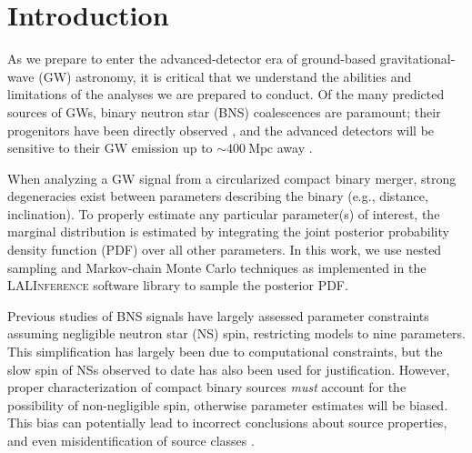 \section{Introduction}

As we prepare to enter the advanced-detector era of ground-based gravitational-wave (GW) astronomy, it is critical that we understand the abilities and limitations of the analyses we are prepared to conduct. Of the many predicted sources of GWs, binary neutron star (BNS) coalescences are paramount; their progenitors have been directly observed \cite{Lorimer_2008}, and the advanced detectors will be sensitive to their GW emission up to $\sim 400~\mathrm{Mpc}$ away \citep{2013arXiv1304.0670L}.

When analyzing a GW signal from a circularized compact binary merger, strong degeneracies exist between parameters describing the binary (e.g., distance, inclination). To properly estimate any particular parameter(s) of interest, the marginal distribution is estimated by integrating the joint posterior probability density function (PDF) over all other parameters. In this work, we use nested sampling \citep{Veitch_2010} and Markov-chain Monte Carlo \citep{Christensen_2003,R_ver_2006,van_der_Sluys_2008} techniques as implemented in the \textsc{LALInference} software library \cite{Veitch_2015} to sample the posterior PDF.

Previous studies of BNS signals have largely assessed parameter constraints assuming negligible neutron star (NS) spin, restricting models to nine parameters. This simplification has largely been due to computational constraints, but the slow spin of NSs observed to date \citep[e.g.,][]{Mandel_2010} has also been used for justification. However, proper characterization of compact binary sources \emph{must} account for the possibility of non-negligible spin, otherwise parameter estimates will be biased.  This bias can potentially lead to incorrect conclusions about source properties, and even misidentification of source classes \citep{Buonanno_2009,Berry_2014}.

